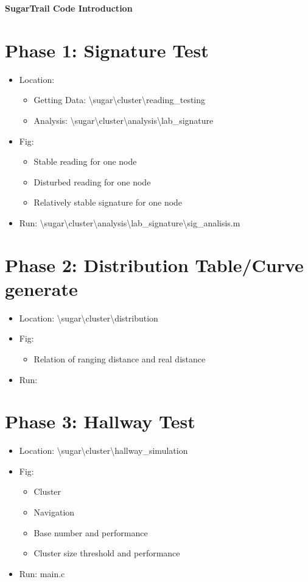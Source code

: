 \documentclass{article}
\begin{document}
\begin{center}
\LARGE \bf{SugarTrail Code Introduction}\\
\end{center}

\section{Phase 1: Signature Test}
\begin{itemize}
\item Location: 
	\begin{itemize}
	\item Getting Data: \textbackslash sugar\textbackslash cluster\textbackslash reading\_testing
	\item Analysis: \textbackslash sugar\textbackslash cluster\textbackslash analysis\textbackslash lab\_signature
	\end{itemize}
\item Fig: 
	\begin{itemize}
	\item Stable reading for one node
	\item Disturbed reading for one node
	\item Relatively stable signature for one node
	\end{itemize}
\item Run: \textbackslash sugar\textbackslash cluster\textbackslash analysis\textbackslash lab\_signature\textbackslash sig\_analisis.m
\end{itemize}


\section{Phase 2: Distribution Table/Curve generate}
\begin{itemize}
\item Location: \textbackslash sugar\textbackslash cluster\textbackslash distribution
\item Fig: 
	\begin{itemize}
	\item	 Relation of ranging distance and real distance
	\end{itemize}
\item Run: 
\end{itemize}


\section{Phase 3: Hallway Test}
\begin{itemize}
\item Location: \textbackslash sugar\textbackslash cluster\textbackslash hallway\_simulation
\item Fig: 
	\begin{itemize}
	\item Cluster
	\item Navigation
	\item Base number and performance
	\item Cluster size threshold and performance
	\end{itemize}
\item Run: main.c
\end{itemize}
\end{document}
